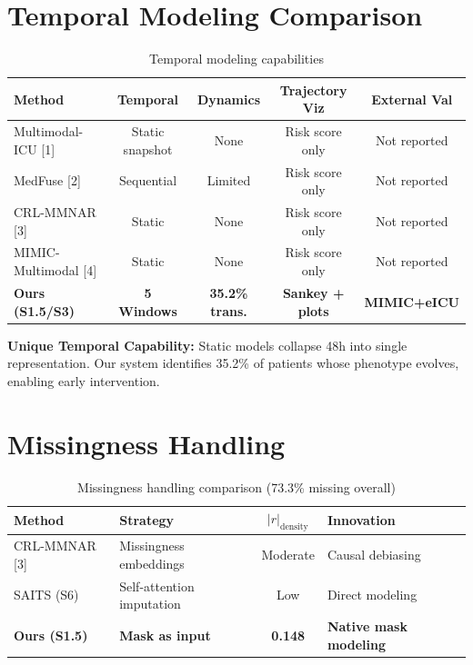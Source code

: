 \documentclass[11pt,a4paper]{article}
\renewcommand{\arraystretch}{1.25}
\begin{document}
\section{Temporal Modeling Comparison}

\begin{table}[H]
\centering
\renewcommand{\arraystretch}{1.3}
\begin{tabular}{lcccc}
\toprule
\rowcolor{tableheader}
\textbf{Method} & \textbf{Temporal} & \textbf{Dynamics} & \textbf{Trajectory Viz} & \textbf{External Val} \\
\midrule
Multimodal-ICU [1] & Static snapshot & None & Risk score only & Not reported \\
\rowcolor{lightbg}
MedFuse [2] & Sequential & Limited & Risk score only & Not reported \\
CRL-MMNAR [3] & Static & None & Risk score only & Not reported \\
\rowcolor{lightbg}
MIMIC-Multimodal [4] & Static & None & Risk score only & Not reported \\
\rowcolor{leading}
\textbf{Ours (S1.5/S3)} & \textbf{5 Windows} & \textbf{35.2\% trans.} & \textbf{Sankey + plots} & \textbf{MIMIC+eICU} \\
\bottomrule
\end{tabular}
\caption{Temporal modeling capabilities}
\end{table}

\begin{uniquebox}
\textbf{Unique Temporal Capability:} Static models collapse 48h into single representation. Our system identifies 35.2\% of patients whose phenotype evolves, enabling early intervention.
\end{uniquebox}

\section{Missingness Handling}

\begin{table}[H]
\centering
\renewcommand{\arraystretch}{1.3}
\begin{tabular}{lp{4cm}cp{4cm}}
\toprule
\rowcolor{tableheader}
\textbf{Method} & \textbf{Strategy} & \textbf{$|r|_{\text{density}}$} & \textbf{Innovation} \\
\midrule
CRL-MMNAR [3] & Missingness embeddings & Moderate & Causal debiasing \\
\rowcolor{lightbg}
SAITS (S6) & Self-attention imputation & Low & Direct modeling \\
\rowcolor{leading}
\textbf{Ours (S1.5)} & \textbf{Mask as input} & \textbf{0.148} & \textbf{Native mask modeling} \\
\bottomrule
\end{tabular}
\caption{Missingness handling comparison (73.3\% missing overall)}
\end{table}
\end{document}
